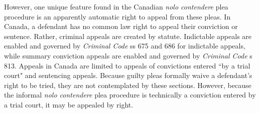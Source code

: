 However, one unique feature found in the Canadian \textit{nolo contendere} plea procedure is an apparently automatic right to appeal from these pleas. In Canada, a defendant has no common law right to appeal their conviction or sentence. Rather, criminal appeals are created by statute. Indictable appeals are enabled and governed by \textit{Criminal Code} ss 675 and 686 for indictable appeals, while summary conviction appeals are enabled and governed by \textit{Criminal Code} s 813. Appeals in Canada are limited to appeals of convictions entered ``by a trial court" and sentencing appeals. Because guilty pleas formally waive a defendant's right to be tried, they are not contemplated by these sections. However,  because the informal \textit{nolo contendere} plea procedure is technically a conviction entered by a trial court, it may be appealed by right.